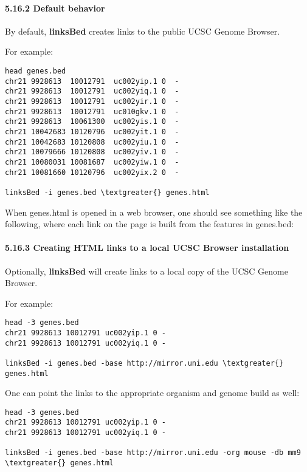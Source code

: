 \documentclass[letterpaper,10pt,english]{sphinxmanual}
\begin{document}
\paragraph{5.16.2 Default behavior}
\label{content/linksBed:default-behavior}
By default, \textbf{linksBed} creates links to the public UCSC Genome Browser.

For example:

\begin{Verbatim}[commandchars=\\\{\}]
head genes.bed
chr21 9928613  10012791  uc002yip.1 0  -
chr21 9928613  10012791  uc002yiq.1 0  -
chr21 9928613  10012791  uc002yir.1 0  -
chr21 9928613  10012791  uc010gkv.1 0  -
chr21 9928613  10061300  uc002yis.1 0  -
chr21 10042683 10120796  uc002yit.1 0  -
chr21 10042683 10120808  uc002yiu.1 0  -
chr21 10079666 10120808  uc002yiv.1 0  -
chr21 10080031 10081687  uc002yiw.1 0  -
chr21 10081660 10120796  uc002yix.2 0  -

linksBed -i genes.bed \textgreater{} genes.html
\end{Verbatim}

When genes.html is opened in a web browser, one should see something like the following, where each
link on the page is built from the features in genes.bed:


\paragraph{5.16.3 Creating HTML links to a local UCSC Browser installation}
\label{content/linksBed:creating-html-links-to-a-local-ucsc-browser-installation}
Optionally, \textbf{linksBed} will create links to a local copy of the UCSC Genome Browser.

For example:

\begin{Verbatim}[commandchars=\\\{\}]
head -3 genes.bed
chr21 9928613 10012791 uc002yip.1 0 -
chr21 9928613 10012791 uc002yiq.1 0 -

linksBed -i genes.bed -base http://mirror.uni.edu \textgreater{} genes.html
\end{Verbatim}

One can point the links to the appropriate organism and genome build as well:

\begin{Verbatim}[commandchars=\\\{\}]
head -3 genes.bed
chr21 9928613 10012791 uc002yip.1 0 -
chr21 9928613 10012791 uc002yiq.1 0 -

linksBed -i genes.bed -base http://mirror.uni.edu -org mouse -db mm9 \textgreater{} genes.html
\end{Verbatim}
\end{document}
